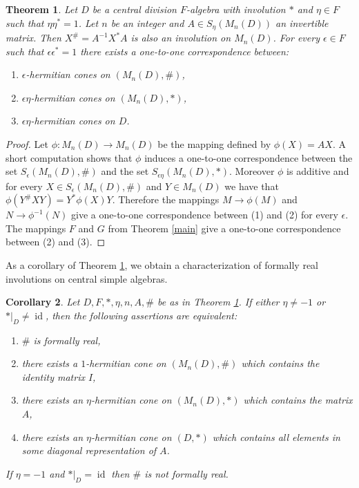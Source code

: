 \documentclass[12pt,reqno]{amsart}
\newtheorem{thm}{Theorem}
\newtheorem{cor}[thm]{Corollary}
\theoremstyle{definition}
\providecommand{\eps}{\epsilon}
\DeclareMathOperator{\id}{id}
\begin{document}
\begin{thm}
\label{arbitrary}
Let $D$ be a central division $F$-algebra with involution $\ast$
and $\eta \in F$ such that $\eta\eta^\ast=1$. Let $n$ be an integer
and $A \in S_\eta(M_n(D))$ an invertible matrix. Then $X^\# = A^{-1}X^*A$ 
is also an involution on $M_n(D)$. For every $\eps \in F$ such that
$\eps \eps^\ast=1$ there exists a one-to-one correspondence between:
\begin{enumerate}
\item $\eps$-hermitian cones on $(M_n(D),\#)$,
\item $\eps \eta$-hermitian cones on $(M_n(D),\ast)$,
\item $\eps \eta$-hermitian cones on $D$.
\end{enumerate}
\end{thm}

\begin{proof}
Let $\phi \colon M_n(D) \to M_n(D)$ be the mapping defined by $\phi(X)=AX$.
A short computation shows that $\phi$ induces a one-to-one correspondence
between the set $S_\eps(M_n(D),\#)$ and the set $S_{\eps \eta}(M_n(D),*)$.
Moreover $\phi$ is additive and for every $X \in S_\eps(M_n(D),\#)$ and $Y \in M_n(D)$
we have that $\phi(Y^\# X Y)=Y^\ast \phi(X) Y$. 
Therefore the mappings $M \to \phi(M)$ and $N \to \phi^{-1}(N)$
give a one-to-one correspondence between (1) and (2) for every $\eps$.
The mappings $F$ and $G$ from Theorem \ref{main} give a 
one-to-one correspondence between (2) and (3).
\end{proof}

As a corollary of Theorem \ref{arbitrary}, we obtain
a characterization of formally real involutions on central simple algebras.

\begin{cor}
\label{firstcorr}
Let $D,F,\ast,\eta,n,A,\#$ be as in Theorem \ref{arbitrary}. If either $\eta \ne -1$ or $\ast|_D \ne \id$,
then the following assertions are equivalent:
\begin{enumerate}
\item $\#$ is formally real,
\item there exists a $1$-hermitian cone on $(M_n(D),\#)$ which contains the identity matrix $I$,
\item there exists an $\eta$-hermitian cone on $(M_n(D),\ast)$ which contains the matrix $A$,
\item there exists an $\eta$-hermitian cone on $(D,\ast)$ which contains all elements in some diagonal
representation of $A$.
\end{enumerate}
If $\eta=-1$ and $\ast|_D = \id$ then $\#$ is not formally real.
\end{cor}
\end{document}
